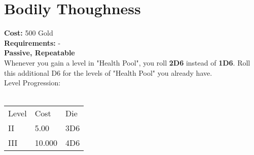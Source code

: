 \section{Bodily Thoughness}\label{sec:bodilythoughness}
\textbf{Cost:} 500 Gold\\
\textbf{Requirements:} -\\
\textbf{Passive, Repeatable}\\
Whenever you gain a level in "Health Pool", you roll \textbf{2D6} instead of \textbf{1D6}.
Roll this additional D6 for the levels of "Health Pool" you already have.
\\
Level Progression:\\
\\
\begin{tabular}{l | l | l }
    Level & Cost & Die\\
    II & 5.00 & 3D6 \\
    III & 10.000 & 4D6\\
\end{tabular}